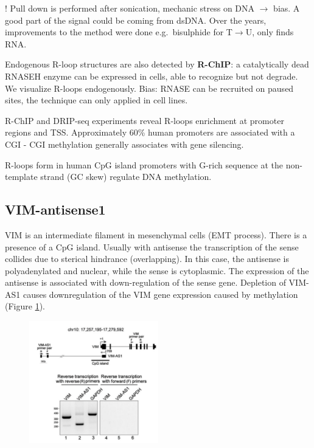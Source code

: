 ! Pull down is performed after sonication, mechanic stress on DNA $\rightarrow$ bias. A good part of the signal could be coming from dsDNA. Over the years, improvements to the method were done e.g.~bisulphide for T$\rightarrow$U, only finds RNA.

Endogenous R-loop structures are also detected by \textbf{R-ChIP}: a catalytically dead RNASEH enzyme can be expressed in cells, able to recognize but not degrade. We visualize R-loops endogenously. Bias: RNASE can be recruited on paused sites, the technique can only applied in cell lines.

R-ChIP and DRIP-seq experiments reveal R-loops enrichment at promoter regions and TSS. Approximately 60\% human promoters are associated with a CGI - CGI methylation generally associates with gene silencing.

R-loops form in human CpG island promoters with G-rich sequence at the non-template strand (GC skew) regulate DNA methylation.

\hypertarget{vim-antisense1}{%
\subsection{VIM-antisense1}\label{vim-antisense1}}

VIM is an intermediate filament in mesenchymal cells (EMT process). There is a presence of a CpG island. Usually with antisense the transcription of the sense collides due to sterical hindrance (overlapping). In this case, the antisense is polyadenylated and nuclear, while the sense is cytoplasmic. The expression of the antisense is associated with down-regulation of the sense gene. Depletion of VIM-AS1 causes downregulation of the VIM gene expression caused by methylation (Figure \ref{fig:vim}).

\begin{figure}
\centering
\includegraphics[width=0.5\textwidth]{../_resources/Screen_Shot_2022-11-23_at_10-18-00.png}
\caption{}
\label{fig:vim}
\end{figure}

